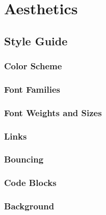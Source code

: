 
\section{Aesthetics}
\subsection{Style Guide}

\subsubsection{Color Scheme}
\cite{colors}
\subsubsection{Font Families}
\subsubsection{Font Weights and Sizes}
\subsubsection{Links}
\subsubsection{Bouncing}
\subsubsection{Code Blocks}
\subsubsection{Background}
